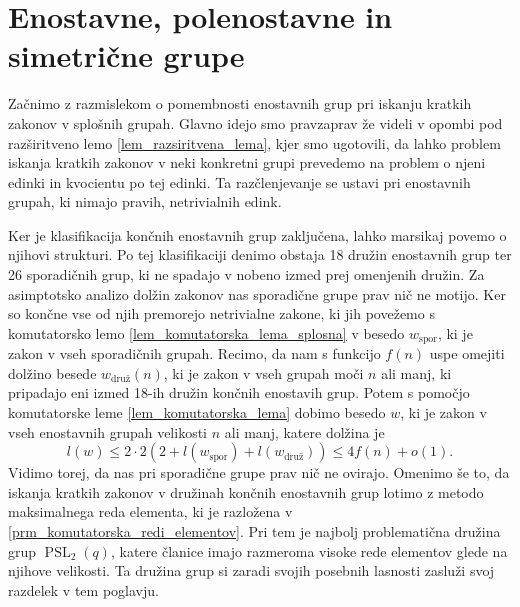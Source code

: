 \section{Enostavne, polenostavne in simetrične grupe}



Začnimo z razmislekom o pomembnosti enostavnih grup pri iskanju kratkih zakonov v splošnih grupah. Glavno idejo smo pravzaprav že videli v opombi pod razširitveno lemo \ref{lem_razsiritvena_lema}, kjer smo ugotovili, da
lahko problem iskanja kratkih zakonov v neki konkretni grupi prevedemo na problem o njeni edinki in kvocientu po tej edinki. Ta razčlenjevanje se ustavi pri enostavnih grupah, ki nimajo pravih, netrivialnih edink.

Ker je klasifikacija končnih enostavnih grup zaključena, lahko marsikaj povemo o njihovi strukturi. Po tej klasifikaciji denimo obstaja 18 družin enostavnih grup ter 26 sporadičnih grup, ki ne spadajo v nobeno izmed prej omenjenih družin.
Za asimptotsko analizo dolžin zakonov nas sporadične grupe prav nič ne motijo. Ker so končne vse od njih premorejo netrivialne zakone, ki jih povežemo s komutatorsko lemo \ref{lem_komutatorska_lema_splosna} v besedo $w_{\text{spor}}$,
ki je zakon v vseh sporadičnih grupah. Recimo, da nam s funkcijo $f(n)$ uspe omejiti dolžino besede $w_{\text{druž}}(n)$, ki je zakon v vseh grupah moči $n$ ali manj, ki pripadajo eni izmed 18-ih družin končnih enostavih grup.
Potem s pomočjo komutatorske leme \ref{lem_komutatorska_lema} dobimo besedo $w$, ki je zakon v vseh enostavnih grupah velikosti $n$ ali manj, katere dolžina je 
\begin{equation*}
    l(w) \le 2 \cdot 2 (2 + l(w_{\text{spor}}) + l(w_{\text{druž}}) )  \le 4f(n) + o(1).
\end{equation*}
Vidimo torej, da nas pri sporadične grupe prav nič ne ovirajo. Omenimo še to, da iskanja kratkih zakonov v družinah končnih enostavnih grup
lotimo z metodo maksimalnega reda elementa, ki je razložena v \ref{prm_komutatorska_redi_elementov}. Pri tem je najbolj problematična družina grup $\operatorname{PSL}_2(q)$,
katere članice imajo razmeroma visoke rede elementov glede na njihove velikosti. Ta družina grup si zaradi svojih posebnih lasnosti zasluži svoj razdelek v tem poglavju.

